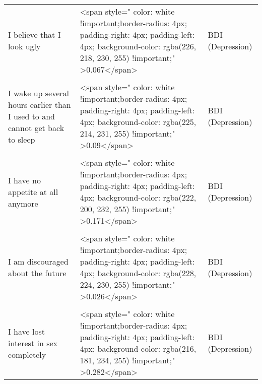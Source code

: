 \documentclass[border=1mm]{standalone}
\begin{document}
\begin{longtable}{lll}
I believe that I look ugly & <span style="     color: white !important;border-radius: 4px; padding-right: 4px; padding-left: 4px; background-color: rgba(226, 218, 230, 255) !important;" >0.067</span> & BDI (Depression)\\
\cellcolor{gray!10}{I can‚Äôt do any work at all} & \cellcolor{gray!10}{<span style="     color: white !important;border-radius: 4px; padding-right: 4px; padding-left: 4px; background-color: rgba(227, 220, 230, 255) !important;" >0.05</span>} & \cellcolor{gray!10}{BDI (Depression)}\\
I wake up several hours earlier than I used to and cannot get back to sleep & <span style="     color: white !important;border-radius: 4px; padding-right: 4px; padding-left: 4px; background-color: rgba(225, 214, 231, 255) !important;" >0.09</span> & BDI (Depression)\\
\cellcolor{gray!10}{I am too tired to do anything} & \cellcolor{gray!10}{<span style="     color: white !important;border-radius: 4px; padding-right: 4px; padding-left: 4px; background-color: rgba(229, 227, 229, 255) !important;" >0.012</span>} & \cellcolor{gray!10}{BDI (Depression)}\\
I have no appetite at all anymore & <span style="     color: white !important;border-radius: 4px; padding-right: 4px; padding-left: 4px; background-color: rgba(222, 200, 232, 255) !important;" >0.171</span> & BDI (Depression)\\
\addlinespace
\cellcolor{gray!10}{I have lost more than 15 pounds} & \cellcolor{gray!10}{<span style="     color: white !important;border-radius: 4px; padding-right: 4px; padding-left: 4px; background-color: rgba(224, 209, 231, 255) !important;" >0.114</span>} & \cellcolor{gray!10}{BDI (Depression)}\\
I am discouraged about the future & <span style="     color: white !important;border-radius: 4px; padding-right: 4px; padding-left: 4px; background-color: rgba(228, 224, 230, 255) !important;" >0.026</span> & BDI (Depression)\\
\cellcolor{gray!10}{I am so worried about my physical problems that I cannot think about anything else} & \cellcolor{gray!10}{<span style="     color: white !important;border-radius: 4px; padding-right: 4px; padding-left: 4px; background-color: rgba(227, 220, 230, 255) !important;" >0.051</span>} & \cellcolor{gray!10}{BDI (Depression)}\\
I have lost interest in sex completely & <span style="     color: white !important;border-radius: 4px; padding-right: 4px; padding-left: 4px; background-color: rgba(216, 181, 234, 255) !important;" >0.282</span> & BDI (Depression)\\

\end{longtable}
\end{document}
